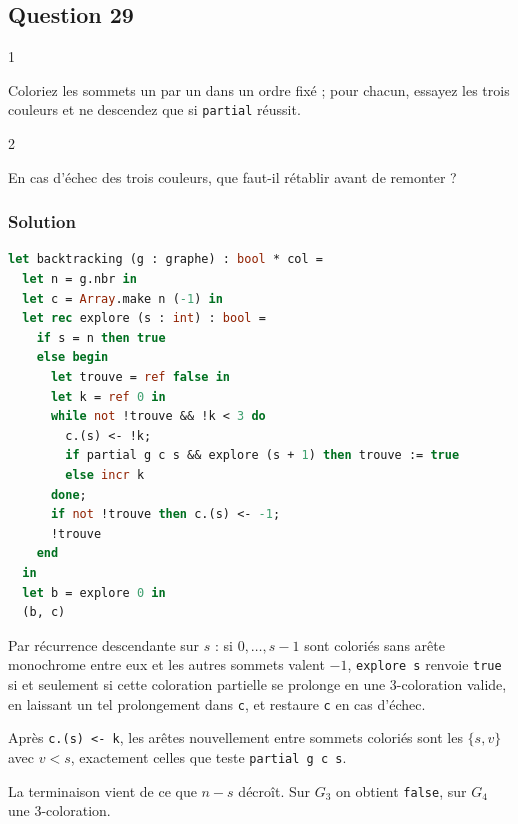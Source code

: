 \documentclass[11pt,a4paper]{article}
\begin{document}
\hypertarget{question-29}{%
\subsection{Question 29}\label{question-29}}

\begin{indication}{1}

Coloriez les sommets un par un dans un ordre fixé ; pour chacun, essayez les trois couleurs et ne descendez que si \texttt{partial} réussit.

\end{indication}

\begin{indication}{2}

En cas d'échec des trois couleurs, que faut-il rétablir avant de remonter ?

\end{indication}

\hypertarget{solution-28}{%
\subsubsection{Solution}\label{solution-28}}

\begin{lstlisting}[language=Caml]
let backtracking (g : graphe) : bool * col =
  let n = g.nbr in
  let c = Array.make n (-1) in
  let rec explore (s : int) : bool =
    if s = n then true
    else begin
      let trouve = ref false in
      let k = ref 0 in
      while not !trouve && !k < 3 do
        c.(s) <- !k;
        if partial g c s && explore (s + 1) then trouve := true
        else incr k
      done;
      if not !trouve then c.(s) <- -1;
      !trouve
    end
  in
  let b = explore 0 in
  (b, c)
\end{lstlisting}

Par récurrence descendante sur \(s\) : si \(0, \dots, s-1\) sont coloriés sans arête monochrome entre eux et les autres sommets valent \(-1\), \texttt{explore\ s} renvoie \texttt{true} si et seulement si cette coloration partielle se prolonge en une 3-coloration valide, en laissant un tel prolongement dans \texttt{c}, et restaure \texttt{c} en cas d'échec.

Après \texttt{c.(s)\ \textless{}-\ k}, les arêtes nouvellement entre sommets coloriés sont les \(\{s, v\}\) avec \(v < s\), exactement celles que teste \texttt{partial\ g\ c\ s}.

La terminaison vient de ce que \(n - s\) décroît. Sur \(G_3\) on obtient \texttt{false}, sur \(G_4\) une 3-coloration.
\end{document}
